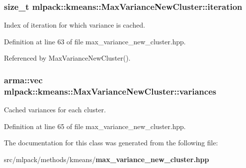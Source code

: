 \subsubsection[{iteration}]{\setlength{\rightskip}{0pt plus 5cm}size\+\_\+t mlpack\+::kmeans\+::\+Max\+Variance\+New\+Cluster\+::iteration\hspace{0.3cm}{\ttfamily [private]}}\label{classmlpack_1_1kmeans_1_1MaxVarianceNewCluster_aab5ea8a18dfdf8e9e0d25c00caff611d}


Index of iteration for which variance is cached. 



Definition at line 63 of file max\+\_\+variance\+\_\+new\+\_\+cluster.\+hpp.



Referenced by Max\+Variance\+New\+Cluster().

\subsubsection[{variances}]{\setlength{\rightskip}{0pt plus 5cm}arma\+::vec mlpack\+::kmeans\+::\+Max\+Variance\+New\+Cluster\+::variances\hspace{0.3cm}{\ttfamily [private]}}\label{classmlpack_1_1kmeans_1_1MaxVarianceNewCluster_a2548cde6d67b71eb9a9d533c370012be}


Cached variances for each cluster. 



Definition at line 65 of file max\+\_\+variance\+\_\+new\+\_\+cluster.\+hpp.



The documentation for this class was generated from the following file\+:\begin{DoxyCompactItemize}
\item 
src/mlpack/methods/kmeans/{\bf max\+\_\+variance\+\_\+new\+\_\+cluster.\+hpp}\end{DoxyCompactItemize}
